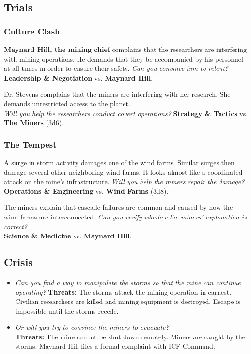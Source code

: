 \documentclass[11pt, a5paper, parskip=half-, DIV=12]{scrartcl}
\begin{document}
\newpage

\subsection*{Trials}
\subsubsection*{Culture Clash}
\textbf{Maynard Hill, the mining chief} complains that the researchers are interfering with mining operations. He demands that they be accompanied by his personnel at all times in order to ensure their safety. \textit{Can you convince him to relent?} \textbf{Leadership \& Negotiation} vs. \textbf{Maynard Hill}.

Dr. Stevens complains that the miners are interfering with her research. She demands unrestricted access to the planet. \\ \textit{Will you help the researchers conduct covert operations?} \textbf{Strategy \& Tactics} vs. \textbf{The Miners} (3d6).

\subsubsection*{The Tempest}
A surge in storm activity damages one of the wind farms. Similar surges then damage several other neighboring wind farms. It looks almost like a coordinated attack on the mine's infrastructure. \textit{Will you help the miners repair the damage?} \textbf{Operations \& Engineering} vs. \textbf{Wind Farms} (3d8).

The miners explain that cascade failures are common and caused by how the wind farms are interconnected. \textit{Can you verify whether the miners' explanation is correct?}
\\ \textbf{Science \& Medicine} vs. \textbf{Maynard Hill}.


\subsection*{Crisis}
\begin{itemize}
	\item \textit{Can you find a way to manipulate the storms so that the mine can continue operating?} \textbf{Threats:} The storms attack the mining operation in earnest. Civilian researchers are killed and mining equipment is destroyed. Escape is impossible until the storms recede.
	\item \textit{Or will you try to convince the miners to evacuate?} \\ \textbf{Threats:} The mine cannot be shut down remotely. Miners are caught by the storms. Maynard Hill files a formal complaint with ICF Command.
\end{itemize}
\end{document}

